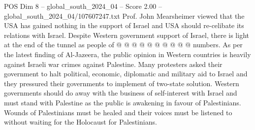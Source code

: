 \begin{textsample}{POS Dim 8 – global\_south\_2024\_04 – Score 2.00 – global\_south\_2024\_04/107607247.txt}
Prof.
John Mearsheimer viewed that the USA has gained nothing in the support of Israel and USA should re-celibate its relations with Israel.
Despite Western government support of Israel, there is light at the end of the tunnel as people of @ @ @ @ @ @ @ @ @ @ numbers.
As per the latest finding of Al-Jazeera, the public opinion in Western countries is heavily against Israeli war crimes against Palestine.
Many protesters asked their government to halt political, economic, diplomatic and military aid to Israel and they pressured their governments to implement of two-state solution.
Western governments should do away with the business of self-interest with Israel and must stand with Palestine as the public is awakening in favour of Palestinians.
Wounds of Palestinians must be healed and their voices must be listened to without waiting for the Holocaust for Palestinians.

\end{textsample}
